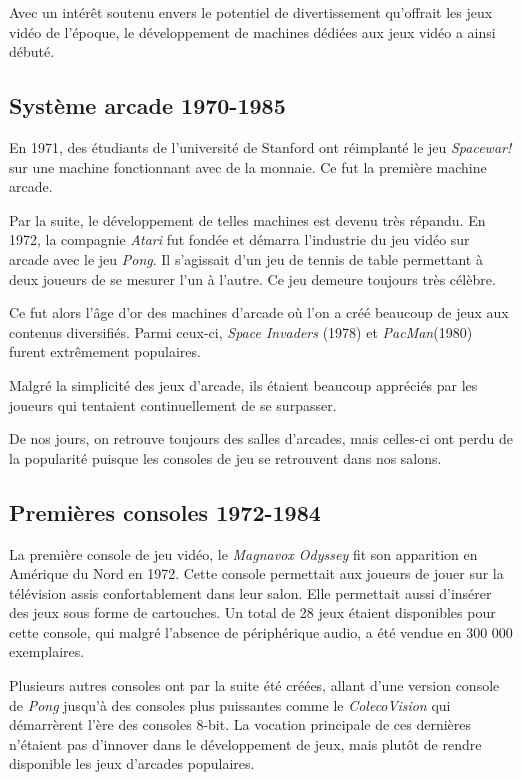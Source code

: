 \documentclass[12pt,twoside,letterpaper,francais]{book}
\newcommand{\si}{{\textit{Space Invaders }}}
\begin{document}
Avec un intérêt soutenu envers le potentiel de divertissement
qu'offrait les jeux vidéo de l'époque, le développement de machines
dédiées aux jeux vidéo a ainsi débuté.


\FloatBarrier
\subsection{Système arcade 1970-1985}
En 1971, des étudiants de l'université de Stanford ont réimplanté le
jeu \textit{Spacewar!} sur une machine fonctionnant avec de la
monnaie. Ce fut la première machine arcade.

Par la suite, le développement de telles machines est devenu très
répandu. En 1972, la compagnie \textit{Atari} fut fondée et démarra
l'industrie du jeu vidéo sur arcade avec le jeu \textit{Pong}. Il
s'agissait d'un jeu de tennis de table permettant à deux joueurs de se
mesurer l'un à l'autre. Ce jeu demeure toujours très célèbre.

Ce fut alors l'âge d'or des machines d'arcade où l'on a créé beaucoup
de jeux aux contenus diversifiés. Parmi ceux-ci, \si(1978) et
\textit{PacMan}(1980) furent extrêmement populaires.

Malgré la simplicité des jeux d'arcade, ils étaient beaucoup appréciés
par les joueurs qui tentaient continuellement de se surpasser.

De nos jours, on retrouve toujours des salles d'arcades, mais
celles-ci ont perdu de la popularité puisque les consoles de jeu se
retrouvent dans nos salons.


\FloatBarrier
\subsection{Premières consoles 1972-1984}
La première console de jeu vidéo, le \textit{Magnavox Odyssey} fit son
apparition en Amérique du Nord en 1972. Cette console permettait aux
joueurs de jouer sur la télévision assis confortablement dans leur
salon. Elle permettait aussi d'insérer des jeux sous forme de
cartouches. Un total de 28 jeux étaient disponibles pour cette
console, qui malgré l'absence de périphérique audio, a été vendue en
300 000 exemplaires.

Plusieurs autres consoles ont par la suite été créées, allant d'une
version console de \textit{Pong} jusqu'à des consoles plus puissantes
comme le \textit{ColecoVision} qui démarrèrent l'ère des consoles
8-bit. La vocation principale de ces dernières n'étaient pas d'innover
dans le développement de jeux, mais plutôt de rendre disponible les
jeux d'arcades populaires.
\end{document}
